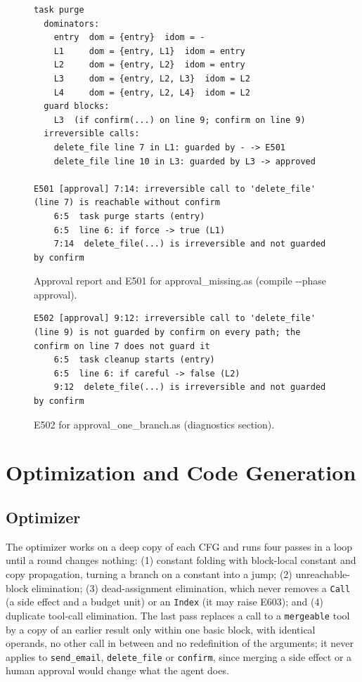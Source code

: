 \documentclass[conference]{IEEEtran}
\begin{document}
\begin{figure}[!htb]
\begin{lstlisting}
task purge
  dominators:
    entry  dom = {entry}  idom = -
    L1     dom = {entry, L1}  idom = entry
    L2     dom = {entry, L2}  idom = entry
    L3     dom = {entry, L2, L3}  idom = L2
    L4     dom = {entry, L2, L4}  idom = L2
  guard blocks:
    L3  (if confirm(...) on line 9; confirm on line 9)
  irreversible calls:
    delete_file line 7 in L1: guarded by - -> E501
    delete_file line 10 in L3: guarded by L3 -> approved

E501 [approval] 7:14: irreversible call to 'delete_file' (line 7) is reachable without confirm
    6:5  task purge starts (entry)
    6:5  line 6: if force -> true (L1)
    7:14  delete_file(...) is irreversible and not guarded by confirm
\end{lstlisting}
\caption{Approval report and E501 for approval\_missing.as (compile -{}-phase approval).}
\label{fig:approval}
\end{figure}

\begin{figure}[!htb]
\begin{lstlisting}
E502 [approval] 9:12: irreversible call to 'delete_file' (line 9) is not guarded by confirm on every path; the confirm on line 7 does not guard it
    6:5  task cleanup starts (entry)
    6:5  line 6: if careful -> false (L2)
    9:12  delete_file(...) is irreversible and not guarded by confirm
\end{lstlisting}
\caption{E502 for approval\_one\_branch.as (diagnostics section).}
\label{fig:e502}
\end{figure}

\section{Optimization and Code Generation}
\subsection{Optimizer}
The optimizer works on a deep copy of each CFG and runs four passes in a loop until a round changes nothing: (1) constant folding with block-local constant and copy propagation, turning a branch on a constant into a jump; (2) unreachable-block elimination; (3) dead-assignment elimination, which never removes a \texttt{Call} (a side effect and a budget unit) or an \texttt{Index} (it may raise E603); and (4) duplicate tool-call elimination. The last pass replaces a call to a \texttt{mergeable} tool by a copy of an earlier result only within one basic block, with identical operands, no other call in between and no redefinition of the arguments; it never applies to \texttt{send\_email}, \texttt{delete\_file} or \texttt{confirm}, since merging a side effect or a human approval would change what the agent does.
\end{document}
